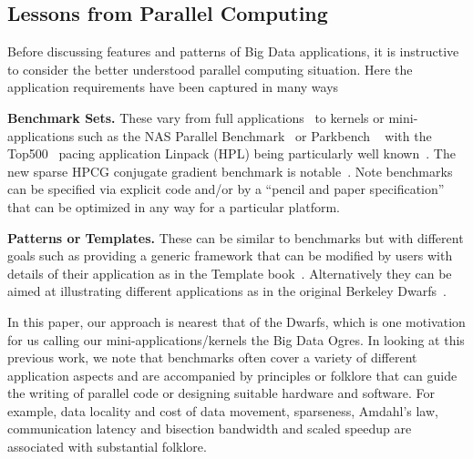 \documentclass{acm_proc_article-sp}
\begin{document}
\subsection{Lessons from Parallel Computing}
Before discussing features and patterns of Big Data applications, it
is instructive to consider the better understood parallel computing
situation. Here the application requirements have been captured in
many ways

\begin{compactenum}
\item \textbf{Benchmark Sets.} These vary from full applications~\cite{b9} to
kernels or mini-applications such as the NAS Parallel Benchmark~\cite{b20,b25}
or Parkbench ~\cite{b5} with the Top500~\cite{b16} pacing application Linpack
(HPL) being particularly well known~\cite{b6}. The new sparse HPCG conjugate gradient
benchmark is notable~\cite{b6}. Note benchmarks can be specified via explicit
code and/or by a ``pencil and paper specification'' that can be
optimized in any way for a particular platform.
\item \textbf{Patterns or Templates.} These can be similar to benchmarks but
with different goals such as providing a generic framework that can be modified
by users with details of their application as in the Template book~\cite{b24,b29}.
Alternatively they can be aimed at illustrating different applications as in
the original Berkeley Dwarfs~\cite{b8}.
\end{compactenum}


In this paper, our approach is nearest that of the Dwarfs, which is one motivation for us calling our mini-applications/kernels the Big Data Ogres. In looking at this previous work, we note that benchmarks often cover a variety of different application aspects and are accompanied by principles or folklore that can guide the writing of parallel code or designing suitable hardware and software. For example, data locality and cost of data movement, sparseness, Amdahl's law, communication latency and bisection bandwidth and scaled speedup are associated with substantial folklore.
\end{document}
